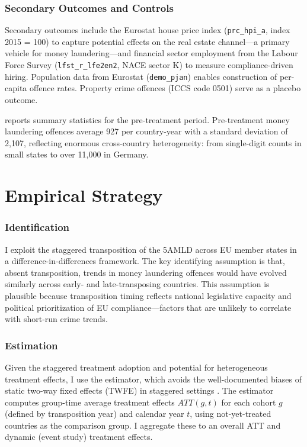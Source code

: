 \documentclass[12pt]{article}
\begin{document}
\subsubsection*{Secondary Outcomes and Controls}
Secondary outcomes include the Eurostat house price index (\texttt{prc\_hpi\_a}, index 2015 = 100) to capture potential effects on the real estate channel---a primary vehicle for money laundering---and financial sector employment from the Labour Force Survey (\texttt{lfst\_r\_lfe2en2}, NACE sector K) to measure compliance-driven hiring. Population data from Eurostat (\texttt{demo\_pjan}) enables construction of per-capita offence rates. Property crime offences (ICCS code 0501) serve as a placebo outcome.

 reports summary statistics for the pre-treatment period. Pre-treatment money laundering offences average 927 per country-year with a standard deviation of 2,107, reflecting enormous cross-country heterogeneity: from single-digit counts in small states to over 11,000 in Germany.





\section{Empirical Strategy}
\label{sec:strategy}

\subsubsection*{Identification}
I exploit the staggered transposition of the 5AMLD across EU member states in a difference-in-differences framework. The key identifying assumption is that, absent transposition, trends in money laundering offences would have evolved similarly across early- and late-transposing countries. This assumption is plausible because transposition timing reflects national legislative capacity and political prioritization of EU compliance---factors that are unlikely to correlate with short-run crime trends.

\subsubsection*{Estimation}
Given the staggered treatment adoption and potential for heterogeneous treatment effects, I use the \citet{callaway2021} estimator, which avoids the well-documented biases of static two-way fixed effects (TWFE) in staggered settings \citep{goodman2021,dechaisemartin2020,sun2021}. The estimator computes group-time average treatment effects $ATT(g,t)$ for each cohort $g$ (defined by transposition year) and calendar year $t$, using not-yet-treated countries as the comparison group. I aggregate these to an overall ATT and dynamic (event study) treatment effects.
\end{document}
